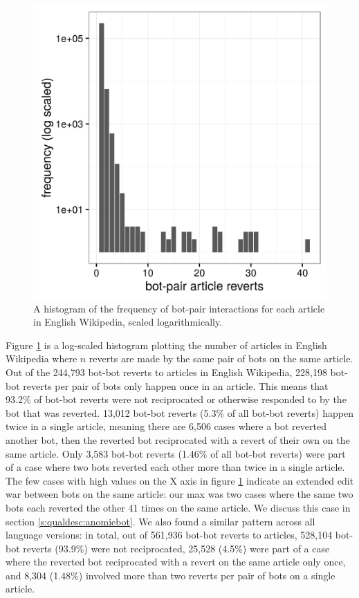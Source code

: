 \documentclass[format=acmsmall, review=false, screen=true]{acmart}%
\begin{document}
\begin{figure}
        \includegraphics[width=.5\textwidth]{figures/botpair-hist.png}
        \caption{A histogram of the frequency of bot-pair interactions for each article in English Wikipedia, scaled logarithmically.}
        \label{fig:botpair-hist}
\end{figure}
Figure \ref{fig:botpair-hist} is a log-scaled histogram plotting the number of articles in English Wikipedia where $n$ reverts are made by the same pair of bots on the same article. Out of the 244,793 bot-bot reverts to articles in English Wikipedia, 228,198 bot-bot reverts per pair of bots only happen once in an article. This means that 93.2\% of bot-bot reverts were not reciprocated or otherwise responded to by the bot that was reverted. 13,012 bot-bot reverts (5.3\% of all bot-bot reverts) happen twice in a single article, meaning there are 6,506 cases where a bot reverted another bot, then the reverted bot reciprocated with a revert of their own on the same article. Only 3,583 bot-bot reverts (1.46\% of all bot-bot reverts) were part of a case where two bots reverted each other more than twice in a single article. The few cases with high values on the X axis in figure \ref{fig:botpair-hist} indicate an extended edit war between bots on the same article: our max was two cases where the same two bots each reverted the other 41 times on the same article. We discuss this case in section \ref{s:qualdesc:anomiebot}. We also found a similar pattern across all language versions: in total, out of 561,936 bot-bot reverts to articles, 528,104 bot-bot reverts (93.9\%) were not reciprocated, 25,528 (4.5\%) were part of a case where the reverted bot reciprocated with a revert on the same article only once, and 8,304 (1.48\%) involved more than two reverts per pair of bots on a single article.
\end{document}
